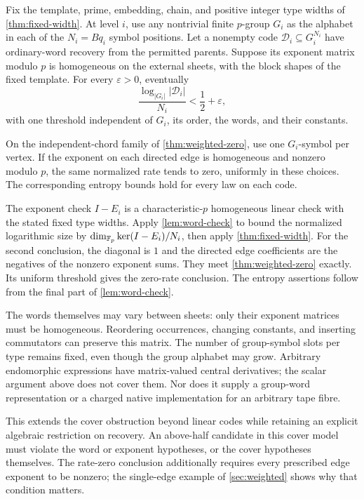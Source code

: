 \begin{corollary}
\label{cor:group-cover}
\notformalized
Fix the template, prime, embedding, chain, and positive integer type
widths of \cref{thm:fixed-width}. At level $i$, use any nontrivial
finite $p$-group $G_i$ as the alphabet in each of the
$N_i=Bq_i$ symbol positions. Let a nonempty code
$\mathcal D_i\subseteq G_i^{N_i}$ have ordinary-word recovery from
the permitted parents. Suppose its exponent matrix modulo $p$ is
homogeneous on the external sheets, with the block shapes of the
fixed template. For every $\varepsilon>0$, eventually
\[
 \frac{\log_{|G_i|}|\mathcal D_i|}{N_i}<\frac12+\varepsilon,
\]
with one threshold independent of $G_i$, its order, the words, and
their constants.

On the independent-chord family of \cref{thm:weighted-zero}, use one
$G_i$-symbol per vertex. If the exponent on each directed edge is
homogeneous and nonzero modulo $p$, the same normalized rate tends
to zero, uniformly in these choices. The corresponding entropy
bounds hold for every law on each code.
\end{corollary}
\begin{informalproof}
The exponent check $I-E_i$ is a characteristic-$p$ homogeneous
linear check with the stated fixed type widths. Apply
\cref{lem:word-check} to bound the normalized logarithmic size by
$\dim_{\mathbb{F}_p}\ker(I-E_i)/N_i$, then apply
\cref{thm:fixed-width}. For the second conclusion, the diagonal is
$1$ and the directed edge coefficients are the negatives of the
nonzero exponent sums. They meet \cref{thm:weighted-zero} exactly.
Its uniform threshold gives the zero-rate conclusion. The entropy
assertions follow from the final part of \cref{lem:word-check}.
\end{informalproof}

The words themselves may vary between sheets: only their exponent
matrices must be homogeneous. Reordering occurrences, changing
constants, and inserting commutators can preserve this matrix.
The number of group-symbol slots per type remains fixed, even though
the group alphabet may grow. Arbitrary endomorphic expressions have
matrix-valued central derivatives; the scalar argument above does
not cover them. Nor does it supply a group-word representation or
a charged native implementation for an arbitrary tape fibre.

This extends the cover obstruction beyond linear codes while retaining
an explicit algebraic restriction on recovery. An above-half candidate
in this cover model must violate the word or exponent hypotheses, or
the cover hypotheses themselves. The rate-zero conclusion additionally
requires every prescribed edge exponent to be nonzero; the single-edge
example of \cref{sec:weighted} shows why that condition matters.
